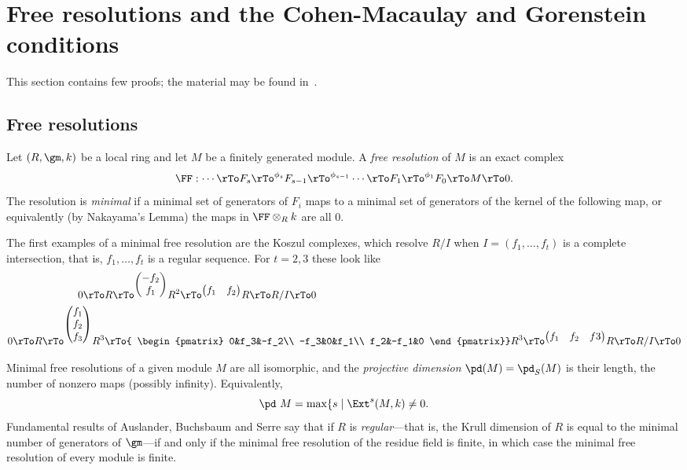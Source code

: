\section{Free resolutions and the Cohen-Macaulay and Gorenstein conditions}
This section contains few proofs; the material may be found in~\cite[Chapter ****]{Eisenbud1995}.

\subsection{Free resolutions}
Let $(R,\gm, k)$ be a local ring and let $M$ be a finitely generated module. A \emph{free resolution} of $M$ is an exact complex
$$
\FF: \cdots \rTo F_s \rTo^{\phi_s} F_{s-1} \rTo^{\phi_{s-1}} \cdots \rTo F_1 \rTo^{\phi_1}  F_0 \rTo M \rTo 0.
$$
The resolution is \emph{minimal} if a minimal set of generators of $F_i$ maps to a minimal set of generators of the kernel of the following map,
or equivalently (by Nakayama's Lemma) the maps in $\FF\otimes_R k$ are all 0.

The first examples of a minimal free resolution are the Koszul complexes, which resolve $R/I$ when
 $I = (f_1,\dots, f_t)$
is a complete intersection, that is, $f_1,\dots, f_t$ is a regular sequence.  For $t = 2,3$ these look like
$$
\begin{aligned}
 0\rTo &R \rTo^{
\begin{pmatrix}
-f_2\\f_1
\end{pmatrix}}
 R^2\rTo^{
 \begin{pmatrix}
f_1&f_2
\end{pmatrix}}
 R \rTo R/I \rTo 0\\
0\rTo R \rTo^{
\begin{pmatrix}
f_1\\f_2\\f_3
\end{pmatrix}} R^3&\rTo{
\begin{pmatrix}
 0&f_3&-f_2\\
 -f_3&0&f_1\\
 f_2&-f_1&0
\end{pmatrix}}
 R^3\rTo^{
 \begin{pmatrix}
f_1&f_2&f3
\end{pmatrix}}R \rTo R/I \rTo 0
\end{aligned}
$$

Minimal free resolutions of a given module $M$ are all isomorphic, and the \emph{projective dimension}  $\pd(M) = \pd_S(M)$ is their length, the number of nonzero
maps (possibly infinity). Equivalently, 
$$
\pd\ M = \max\{s \mid \Ext^s(M,k) \neq 0.
$$
Fundamental
results of Auslander, Buchsbaum and Serre say that if $R$ is \emph{regular}---that is, the Krull dimension of $R$ is equal to the minimal number
of generators of $\gm$---if and only if the minimal free resolution of the residue field is finite, in which case
the minimal free resolution of every module is finite. 

